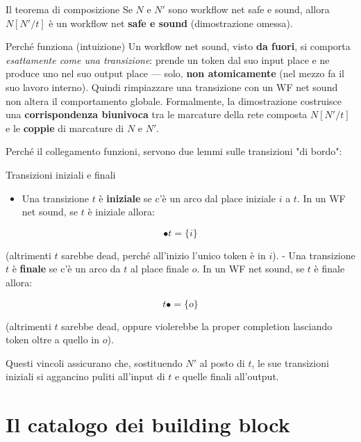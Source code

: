 \begin{boxtheorem}{Il teorema di composizione}
Se $N$ e $N'$ sono workflow net safe e sound, allora $N[N'/t]$ è un workflow net \textbf{safe e sound} (dimostrazione omessa).
\end{boxtheorem}

\begin{boxabstract}{Perché funziona (intuizione)}
Un workflow net sound, visto \textbf{da fuori}, si comporta \emph{esattamente come una transizione}: prende un token dal suo input place e ne produce uno nel suo output place — solo, \textbf{non atomicamente} (nel mezzo fa il suo lavoro interno). Quindi rimpiazzare una transizione con un WF net sound non altera il comportamento globale. Formalmente, la dimostrazione costruisce una \textbf{corrispondenza biunivoca} tra le marcature della rete composta $N[N'/t]$ e le \textbf{coppie} di marcature di $N$ e $N'$.
\end{boxabstract}

Perché il collegamento funzioni, servono due lemmi sulle transizioni "di bordo":

\begin{boxnote}{Transizioni iniziali e finali}
\begin{itemize}
\item Una transizione $t$ è \textbf{iniziale} se c'è un arco dal place iniziale $i$ a $t$. In un WF net sound, se $t$ è iniziale allora:
\end{itemize}

\[
\bullet t = \{i\}
\]

(altrimenti $t$ sarebbe dead, perché all'inizio l'unico token è in $i$). - Una transizione $t$ è \textbf{finale} se c'è un arco da $t$ al place finale $o$. In un WF net sound, se $t$ è finale allora:

\[
t\bullet = \{o\}
\]

(altrimenti $t$ sarebbe dead, oppure violerebbe la proper completion lasciando token oltre a quello in $o$).

Questi vincoli assicurano che, sostituendo $N'$ al posto di $t$, le sue transizioni iniziali si aggancino puliti all'input di $t$ e quelle finali all'output.
\end{boxnote}

\section{\texorpdfstring{Il catalogo dei building block}{Il catalogo dei building block}}

